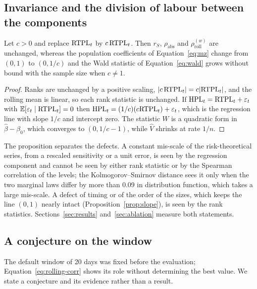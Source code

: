\subsection{Invariance and the division of labour between the components}
\label{sec:theory-invariance}

\begin{proposition}[Invariance]
\label{prop:invariance}
Let $c>0$ and replace $\mathrm{RTPL}_t$ by $c\,\mathrm{RTPL}_t$.
Then $r_S$, $\rho_{\mathrm{abs}}$ and $\rho_{\mathrm{roll}}^{(w)}$ are unchanged, whereas the population coefficients of Equation~\eqref{eq:mz} change from $(0,1)$ to $(0,1/c)$ and the Wald statistic of Equation~\eqref{eq:wald} grows without bound with the sample size when $c\ne1$.
\end{proposition}

\begin{proof}
Ranks are unchanged by a positive scaling, $|c\,\mathrm{RTPL}_t|=c|\mathrm{RTPL}_t|$, and the rolling mean is linear, so each rank statistic is unchanged.
If $\mathrm{HPL}_t=\mathrm{RTPL}_t+\varepsilon_t$ with $\mathbb{E}[\varepsilon_t\mid\mathrm{RTPL}_t]=0$ then $\mathrm{HPL}_t=(1/c)(c\mathrm{RTPL}_t)+\varepsilon_t$, which is the regression line with slope $1/c$ and intercept zero.
The statistic $W$ is a quadratic form in $\hat\beta-\beta_0$, which converges to $(0,1/c-1)$, while $\hat V$ shrinks at rate $1/n$.
\end{proof}

The proposition separates the defects.
A constant mis-scale of the risk-theoretical series, from a rescaled sensitivity or a unit error, is seen by the regression component and cannot be seen by either rank statistic or by the Spearman correlation of the levels; the Kolmogorov--Smirnov distance sees it only when the two marginal laws differ by more than 0.09 in distribution function, which takes a large mis-scale.
A defect of timing or of the order of the sizes, which keeps the line $(0,1)$ nearly intact (Proposition~\ref{prop:slope}), is seen by the rank statistics.
Sections~\ref{sec:results} and~\ref{sec:ablation} measure both statements.

\subsection{A conjecture on the window}
\label{sec:theory-conjecture}

The default window of 20 days was fixed before the evaluation; Equation~\eqref{eq:rolling-corr} shows its role without determining the best value.
We state a conjecture and its evidence rather than a result.

